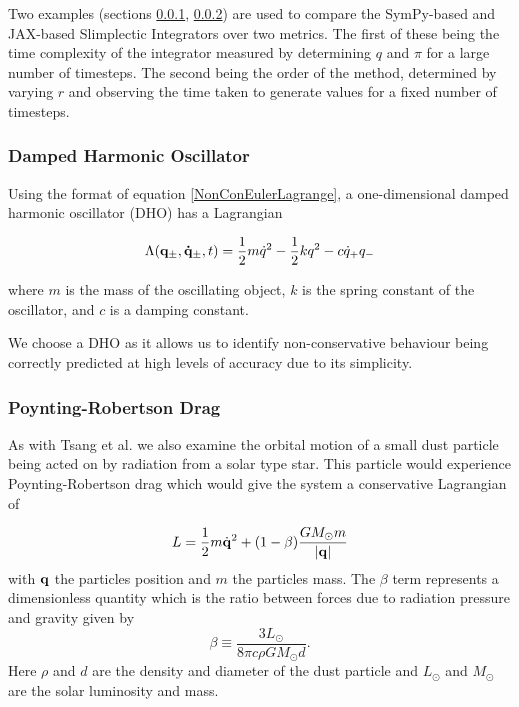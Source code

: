 \documentclass[10pt]{iopart}
\begin{document}
Two examples (sections \ref{DHO}, \ref{PRD}) are used to compare the SymPy-based and JAX-based Slimplectic Integrators over two metrics. The first of these being the time complexity of the integrator measured by determining $q$ and $\pi$ for a large number of timesteps. The second being the order of the method, determined by varying $r$ and observing the time taken to generate values for a fixed number of timesteps.


\subsubsection{Damped Harmonic Oscillator \\}
\label{DHO}
Using the format of equation \ref{NonConEulerLagrange}, a one-dimensional damped harmonic oscillator (DHO) has a Lagrangian

\begin{equation}
\label{DHOeqn}
	\Lambda(\bold{q_{\pm},\dot{q}_{\pm}},t) = \frac{1}{2}m\dot{q}^2 - \frac{1}{2}kq^2 - c\dot{q}_+q_-
\end{equation}

where $m$ is the mass of the oscillating object, $k$ is the spring constant of the oscillator, and $c$ is a damping constant.  

We choose a DHO as it allows us to identify non-conservative behaviour being correctly predicted at high levels of accuracy due to its simplicity. 

\subsubsection{Poynting-Robertson Drag \\}
\label{PRD}
As with Tsang et al. \cite{Tsang_Slimplectic} we also examine the orbital motion of a small dust particle being acted on by radiation from a solar type star. This particle would experience Poynting-Robertson drag \cite{Poynting-Robertson} which would give the system a conservative Lagrangian of 

\begin{equation}
	L = \frac{1}{2}m\dot{\bold{q}}^2 + (1-\beta)\frac{GM_\odot m}{|\bold{q}|}
\end{equation} 
with $\bold{q}$ the particles position and $m$ the particles mass. The $\beta$ term represents a dimensionless quantity which is the ratio between forces due to radiation pressure and gravity given by 
\begin{equation}
	\beta\equiv\frac{3L_\odot}{8\pi c\rho GM_\odot d}.
\end{equation}
Here $\rho$ and $d$ are the density and diameter of the dust particle and $L_\odot$ and $M_\odot$ are the solar luminosity and mass.
\end{document}
